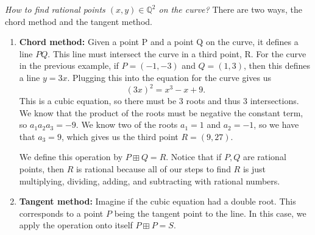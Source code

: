 \textit{How to find rational points $(x,y) \in \mathbb{Q}^2$ on the curve?} There are two ways, the chord method and the tangent method.
\begin{enumerate}
    \item \textbf{Chord method:} Given a point P and a point Q on the curve, it defines a line $PQ$. This line must intersect the curve in a third point, R. For the curve in the previous example, if $P=(-1, -3)$ and $Q=(1, 3)$, then this defines a line $y=3x$. Plugging this into the equation for the curve gives us
    $$(3x)^2 = x^3 - x + 9.$$
    This is a cubic equation, so there must be 3 roots and thus 3 intersections. We know that the product of the roots must be negative the constant term, so $a_1 a_2 a_3 = -9$. We know two of the roots $a_1 = 1$ and $a_2 = -1$, so we have that $a_3 = 9$, which gives us the third point $R = (9, 27)$.

    We define this operation by $P \boxplus Q = R$. Notice that if $P, Q$ are rational points, then $R$ is rational because all of our steps to find $R$ is just multiplying, dividing, adding, and subtracting with rational numbers.

    \begin{center}
        \def\svgwidth{0.35\linewidth}
        
    \end{center}


    \pagebreak
    \item \textbf{Tangent method:} Imagine if the cubic equation had a double root. This corresponds to a point $P$ being the tangent point to the line. In this case, we apply the operation onto itself $P \boxplus P = S$.

    \begin{center}
        \def\svgwidth{0.35\linewidth}
        
    \end{center}
\end{enumerate}


    
